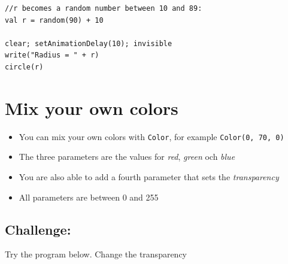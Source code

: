   

\begin{lstlisting}[basicstyle={\ttfamily\fontsize{20}{24}\selectfont},numbers=none]
//r becomes a random number between 10 and 89:
val r = random(90) + 10   

clear; setAnimationDelay(10); invisible
write("Radius = " + r)
circle(r)
\end{lstlisting}
        
\chapter{Mix your own colors}

\begin{itemize}

\item {You can mix your own colors with \lstinline{Color}, for example \lstinline{Color(0, 70, 0)}}
\item {The three parameters are the values for {\it red}, {\it green} och {\it blue}}
\item {You are also able to add a fourth parameter that sets the {\it transparency}}
\item {All parameters are between 0 and 255}

\end{itemize}


\section*{\color{BrickRed}Challenge:}
Try the program below. Change the transparency

